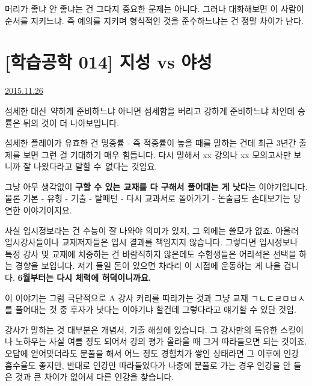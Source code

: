 머리가 좋냐 안 좋냐는 건 그다지 중요한 문제는 아니다.
그러나 대화해보면 이 사람이 순서를 지키느냐. 즉 예의를 지키며 형식적인 것을 준수하느냐는 건 정말 차이가 난다.
\vspace{5mm}







\section{[학습공학 014] 지성 vs 야성}
\href{https://www.kockoc.com/Apoc/511886}{2015.11.26}

\vspace{5mm}

섬세한 대신 약하게 준비하느냐
아니면 섬세함을 버리고 강하게 준비하느냐 차인데
승률은 뒤의 것이 더 나아보입니다.
\vspace{5mm}

섬세한 플레이가 유효한 건 명중률 - 즉 적중률이 높을 때를 말하는 건데
최근 3년간 출제를 보면 그런 걸 기대하기 매우 힘듭니다.
다시 말해서 xx 강의나 xx 모의고사만 보니까 잘 나왔다라고 말할 수 없다는 것임요.
\vspace{5mm}

그냥 아무 생각없이 \textbf{구할 수 있는 교재를 다 구해서 풀어대는 게 낫다}는 이야기입니다.
물론 기본 - 유형 - 기출 - 탈패턴 - 다시 교과서로 돌아가기 - 논술급도 손대보기는 당연한 이야기이지요.
\vspace{5mm}

사실 입시정보라는 건 수능이 잘 나와야 의미가 있지, 그 외에는 쓸모가 없죠.
아울러 입시강사들이나 교재저자들은 입시 결과를 책임지지 않습니다.
그렇다면 입시정보나 특정 강사 및 교재에 치중하는 건 바람직하지 않은데도 수험생들은 어리석은 선택을 하는 경향을 보입니다.
저기 들일 돈이 있으면 차라리 이 시점에 운동하는 게 나을 겁니다. \textbf{6월부터는 다시 체력에 허덕이니까요.}
\vspace{5mm}

이 이야기는 그럼 극단적으로
A 강사 커리를 따라가는 것과
그냥 교재 ㄱㄴㄷㄹㅁㅂㅅ를 풀어대는 것 중 후자가 낫다는 이야기냐 할건데
그렇다라고 얘기할 수 있단 것임.
\vspace{5mm}

강사가 말하는 것 대부분은 개념서, 기출 해설에 있습니다.
그 강사만의 특유한 스킬이나 노하우는 사실 여름 정도 되어서 강의 평가 올라올 때 그거 따라들으면 되는 것이죠.
오답에 얻어맞더라도 문풀을 해서 어느 정도 경험치가 쌓인 상태라면 그 이후에 인강 흡수율도 좋지만,
반대로 인강만 따라들었다가 나중에 문풀로 가는 경우 인강을 안 들은 것과 큰 차이가 없어서 다른 인강을 찾습니다.
\vspace{5mm}

